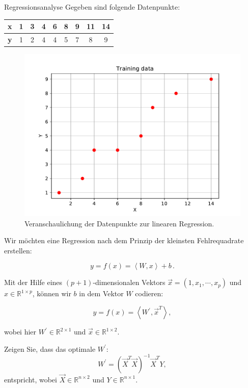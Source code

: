 \begin{task}[credit=7]{Regressionsanalyse}
Gegeben sind folgende Datenpunkte:

\begin{table}[h]
\centering
\begin{tabular}{c|cccccccc}
\toprule
\textbf{x} & 1 & 3 & 4 & 6 & 8 & 9 & 11 & 14 \\ \hline
\textbf{y} & 1 & 2 & 4 & 4 & 5 & 7 & 8  & 9  \\
\bottomrule
\end{tabular}
\end{table}

\begin{figure}[h]
\centering
\caption{Veranschaulichung der Datenpunkte zur linearen Regression.}
\includegraphics[width=0.5\linewidth]{media/images/data.pdf}
\end{figure}

Wir möchten eine Regression nach dem Prinzip der kleinsten Fehlrequadrate erstellen:

\begin{equation}
y =f(x)=\left \langle W, x  \right \rangle+b\,.
\end{equation}

Mit der Hilfe eines $(p+1)$-dimensionalen Vektors $\vec{x}=(1, x_1, \cdots , x_p)$ und $x \in \mathbb{R}^{1 \times p}$, können wir $b$ in dem Vektor $W$ codieren:

\begin{equation}
y =f(x)=\left \langle W^{'}, \vec{x}^{T}  \right \rangle,
\end{equation}

wobei hier $W^{'} \in \mathbb{R}^{2 \times 1}$ und $\vec{x} \in \mathbb{R}^{1 \times 2}$.

\begin{subtask}[title=Herleitung,points=5]
 Zeigen Sie, dass das optimale $W^{'}$:
\begin{equation}
W^{'} =  (\vec{X}^{T}\vec{X})^{-1}\vec{X}^{T}Y,
\end{equation}
entspricht, wobei $\vec{X} \in \mathbb{R}^{n \times 2}$ und $Y \in \mathbb{R}^{n \times 1}$.


\end{subtask}
\end{task}
